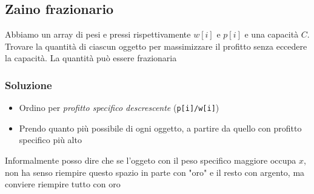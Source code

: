 \subsection{Zaino frazionario}
Abbiamo un array di pesi e pressi rispettivamente $ w\left[i\right] $ e $ p\left[i\right] $ e una capacità $ C $. Trovare la quantità di ciascun oggetto per massimizzare il profitto senza eccedere la capacità. La quantità può essere frazionaria

\subsubsection{Soluzione}
\begin{itemize}
	\item Ordino per \textit{profitto specifico descrescente} (\verb|p[i]/w[i]|)
	\item Prendo quanto più possibile di ogni oggetto, a partire da quello con profitto specifico più alto
\end{itemize}
Informalmente posso dire che se l'oggeto con il peso specifico maggiore occupa $ x $, non ha senso riempire questo spazio in parte con "oro" e il resto con argento, ma conviere riempire tutto con oro

